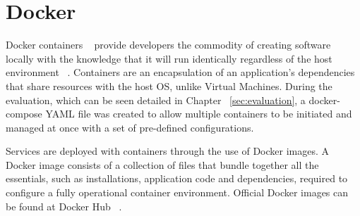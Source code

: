 \section{Docker}
Docker containers ~\cite{docker_containers} provide developers the commodity of creating software locally with the knowledge that it will run identically regardless of the host environment ~\cite{using_docker_book}. Containers are an encapsulation of an application's dependencies that share resources with the host OS, unlike Virtual Machines. During the evaluation, which can be seen detailed in Chapter ~\ref{sec:evaluation}, a docker-compose YAML file was created to allow multiple containers to be initiated and managed at once with a set of pre-defined configurations. 

Services are deployed with containers through the use of Docker images. A Docker image consists of a collection of files that bundle together all the essentials, such as installations, application code and dependencies, required to configure a fully operational container environment. Official Docker images can be found at Docker Hub ~\cite{docker_hub}.